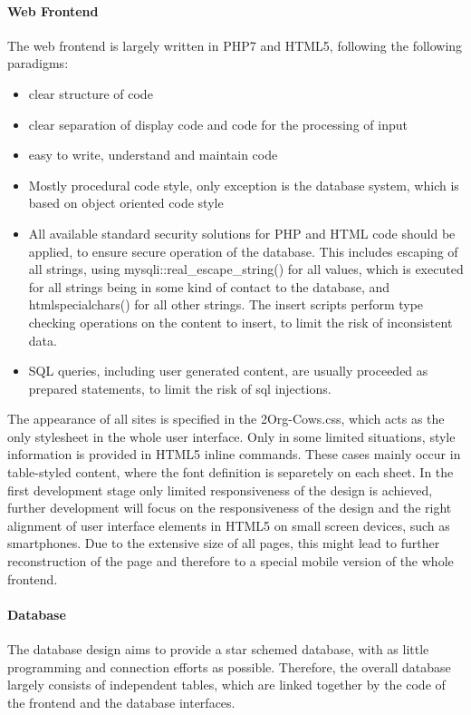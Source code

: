 \paragraph{Web Frontend}
The web frontend is largely written in PHP7 and HTML5, following the following paradigms: 
\begin{itemize}
 \item clear structure of code
 \item clear separation of display code and code for the processing of input
 \item easy to write, understand and maintain code
 \item Mostly procedural code style, only exception is the database system, which is based on object oriented code style
 \item All available standard security solutions for PHP and HTML code should be applied, to ensure secure operation of the database. This includes escaping of all strings, using 
 mysqli::real\_escape\_string() for all values, which is executed for all strings being in some kind of contact to the database, and htmlspecialchars() for all other strings. 
 The insert scripts perform type checking operations on the content to insert, to limit the risk of inconsistent data.
 \item SQL queries, including user generated content, are usually proceeded as prepared statements, to limit the risk of sql injections.
\end{itemize}
The appearance of all sites is specified in the 2Org-Cows.css, which acts as the only stylesheet in the whole user interface. Only in some limited situations, style information is 
provided in HTML5 inline commands. These cases mainly occur in table-styled content, where the font definition is separetely on each sheet.  
In the first development stage only limited responsiveness of the design is achieved, further development will focus on the responsiveness of the design
and the right alignment of user interface elements in HTML5 on small screen devices, such as smartphones. Due to the extensive size of all pages, this might lead to further 
reconstruction of the page and therefore to a special mobile version of the whole frontend.
\paragraph{Database}
The database design aims to provide a star schemed database, with as little programming and connection efforts as possible. Therefore, the overall database largely consists of 
independent tables, which are linked together by the code of the frontend and the database interfaces.
